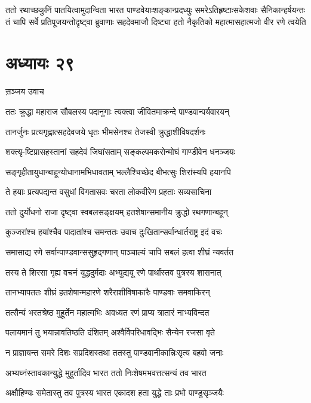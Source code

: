 ततो रथाच्छकुनिं पातयित्वामुदान्विता भारत पाण्डवेयाःशङ्कान्प्रदध्युः समरेऽतिहृष्टाःसकेशवाः सैनिकान्हर्षयन्तः
\twolineshloka
{तं चापि सर्वे प्रतिपूजयन्तोदृष्ट्वा ब्रुवाणाः सहदेवमाजौ}
{दिष्ट्या हतो नैकृतिको महात्मासहात्मजो वीर रणे त्वयेति}


\chapter{अध्यायः २९}
\twolineshloka
{स़ञ्जय उवाच}
{}


\twolineshloka
{ततः क्रुद्धा महाराज सौबलस्य पदानुगाः}
{त्यक्त्वा जीवितमाक्रन्दे पाण्डवान्पर्यवारयन्}


\twolineshloka
{तानर्जुनः प्रत्यगृह्णात्सहदेवजये धृतः}
{भीमसेनश्च तेजस्वी क्रुद्धाशीविषदर्शनः}


\twolineshloka
{शक्त्यृ-ष्टिप्रासहस्तानां सहदेवं जिघांसताम्}
{सङ्कल्पमकरोन्मोघं गाण्डीवेन धनञ्जयः}


\twolineshloka
{सङ्गृहीतायुधान्बाहून्योधानामभिधावताम्}
{भल्लैश्चिच्छेद बीभत्सुः शिरांस्यपि हयानपि}


\twolineshloka
{ते हयाः प्रत्यपद्यन्त वसुधां विगतासवः}
{चरता लोकवीरेण प्रहताः सव्यसाचिना}


\twolineshloka
{ततो दुर्योधनो राजा दृष्ट्वा स्वबलसङ्क्षयम्}
{हतशेषान्समानीय क्रुद्धो रथगणान्बहून्}


\twolineshloka
{कुञ्जरांश्च हयांश्चैव पादातांश्च समन्ततः}
{उवाच दुःखितान्सर्वान्धार्तराष्ट्र इदं वचः}


\twolineshloka
{समासाद्य रणे सर्वान्पाण्डवान्ससुहृद्गणान्}
{पाञ्चाल्यं चापि सबलं हत्वा शीघ्रं न्यवर्तत}


\twolineshloka
{तस्य ते शिरसा गृह्य वचनं युद्धदुर्मदाः}
{अभ्युद्ययू रणे पार्थांस्तव पुत्रस्य शासनात्}


\twolineshloka
{तानभ्यापततः शीघ्रं हतशेषान्महारणे}
{शरैराशीविषाकारैः पाण्डवाः समवाकिरन्}


\twolineshloka
{तत्सैन्यं भरतश्रेष्ठ मुहूर्तेन महात्मभिः}
{अवध्यत रणं प्राप्य त्रातारं नाभ्यविन्दत}


\twolineshloka
{पलायमानं तु भयान्नावतिष्ठति दंशितम्}
{अश्वैर्विपरिधावद्भिः सैन्येन रजसा वृते}


\twolineshloka
{न प्राज्ञायन्त समरे दिशः सप्रदिशस्तथा}
{ततस्तु पाण्डवानीकान्निःसृत्य बहवो जनाः}


\twolineshloka
{अभ्यघ्नंस्तावकान्युद्धे मुहूर्तादिव भारत}
{ततो निःशेषमभवत्तत्सन्यं तव भारत}


\twolineshloka
{अक्षौहिण्यः समेतास्तु तव पुत्रस्य भारत}
{एकादश हता युद्धे ताः प्रभो पाण्डुसृञ्जयैः}


